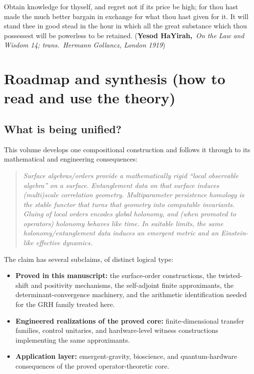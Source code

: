 \documentclass[11pt,oneside]{amsbook}
\numberwithin{equation}{section}
\theoremstyle{plain}
\theoremstyle{definition}
\theoremstyle{remark}
\begin{document}
\fi

Obtain knowledge for thyself, and regret not if its price be high; for thou hast
made the much better bargain in exchange for what thou hast given for it.
It will stand thee in good stead in the hour in which all the great substance
which thou possessest will be powerless to be retained.
(\textbf{Yesod HaYirah,}\emph{\ On the Law and Wisdom 14; trans.\ Hermann Gollancz, London 1919})
\vfill


\tableofcontents
\mainmatter

\chapter*{Roadmap and synthesis (how to read and use the theory)}

\section*{What is being unified?}

This volume develops one compositional construction and follows it through to its mathematical and engineering consequences:

\begin{quote}
\emph{Surface algebras/orders provide a mathematically rigid ``local observable algebra'' on a surface.
Entanglement data on that surface induces (multi)scale correlation geometry.
Multiparameter persistence homology is the stable functor that turns that geometry into computable invariants.
Gluing of local orders encodes global holonomy, and (when promoted to operators) holonomy behaves like time.
In suitable limits, the same holonomy/entanglement data induces an emergent metric and an Einstein-like effective dynamics.}
\end{quote}

The claim has several subclaims, of distinct logical type:
\begin{itemize}
\item \textbf{Proved in this manuscript:} the surface-order constructions, the twisted-shift and positivity mechanisms, the self-adjoint finite approximants, the determinant-convergence machinery, and the arithmetic identification needed for the GRH family treated here.
\item \textbf{Engineered realizations of the proved core:} finite-dimensional transfer families, control unitaries, and hardware-level witness constructions implementing the same approximants.
\item \textbf{Application layer:} emergent-gravity, bioscience, and quantum-hardware consequences of the proved operator-theoretic core.
\end{itemize}
\end{document}

